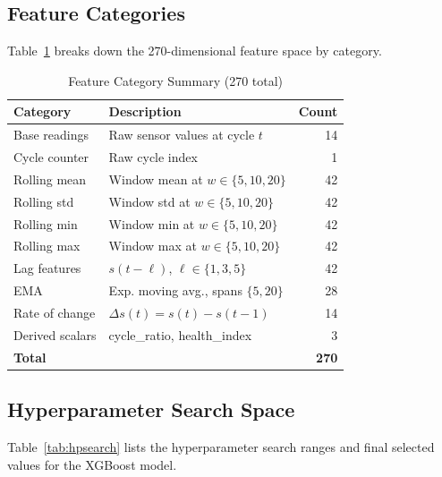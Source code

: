 \documentclass[10pt, journal, letterpaper]{IEEEtran}
\begin{document}
\subsection{Feature Categories}

Table~\ref{tab:features} breaks down the 270-dimensional feature space by
category.

\begin{table}[htbp]
\caption{Feature Category Summary (270 total)}
\label{tab:features}
\centering\small
\begin{tabular}{llr}
\toprule
\textbf{Category} & \textbf{Description} & \textbf{Count} \\
\midrule
Base readings   & Raw sensor values at cycle $t$             & 14  \\
Cycle counter   & Raw cycle index                            & 1   \\
Rolling mean    & Window mean at $w \in \{5,10,20\}$         & 42  \\
Rolling std     & Window std at $w \in \{5,10,20\}$          & 42  \\
Rolling min     & Window min at $w \in \{5,10,20\}$          & 42  \\
Rolling max     & Window max at $w \in \{5,10,20\}$          & 42  \\
Lag features    & $s(t-\ell)$, $\ell \in \{1,3,5\}$         & 42  \\
EMA             & Exp. moving avg., spans $\{5,20\}$        & 28  \\
Rate of change  & $\Delta s(t) = s(t) - s(t-1)$             & 14  \\
Derived scalars & cycle\_ratio, health\_index                & 3   \\
\midrule
\textbf{Total}  &                                            & \textbf{270} \\
\bottomrule
\end{tabular}
\end{table}

\subsection{Hyperparameter Search Space}

Table~\ref{tab:hpsearch} lists the hyperparameter search ranges and final
selected values for the XGBoost model.
\end{document}
